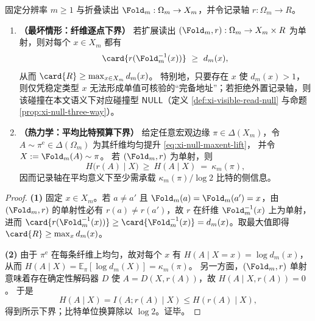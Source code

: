 \begin{theorem}\label{thm:address-defect-law}
固定分辨率 \(m\ge 1\) 与折叠读出 \(\Fold_m:\Omega_m\to X_m\)，并令记录轴 \(r:\Omega_m\to R\)。
\begin{enumerate}
  \item \textbf{（最坏情形：纤维逐点下界）}
  若扩展读出 \((\Fold_m,r):\Omega_m\to X_m\times R\) 为单射，则对每个 \(x\in X_m\) 都有
  \[
  \card{r(\Fold_m^{-1}(x))}\ \ge\ d_m(x),
  \]
  从而 \(\card{R}\ge \max_{x\in X_m} d_m(x)\)。
  特别地，只要存在 \(x\) 使 \(d_m(x)>1\)，则仅凭稳定类型 \(x\) 无法形成单值可核验的“完备地址”；若拒绝外置记录轴，则该碰撞在本文语义下对应碰撞型 \(\mathsf{NULL}\)（定义 \ref{def:xi-visible-read-null} 与命题 \ref{prop:xi-null-three-way}）。

  \item \textbf{（热力学：平均比特预算下界）}
  给定任意宏观边缘 \(\pi\in\Delta(X_m)\)，令 \(A\sim\pi^{\mathrm{e}}\in\Delta(\Omega_m)\) 为其纤维均匀提升 \eqref{eq:xi-null-maxent-lift}，
  并令 \(X:=\Fold_m(A)\sim\pi\)。
  若 \((\Fold_m,r)\) 为单射，则
  \[
  H\bigl(r(A)\mid X\bigr)\ \ge\ H(A\mid X)\ =\ \kappa_m(\pi),
  \]
  因而记录轴在平均意义下至少需承载 \(\kappa_m(\pi)/\log 2\) 比特的侧信息。
\end{enumerate}
\end{theorem}

\begin{proof}
\textbf{(1)} 固定 \(x\in X_m\)。若 \(a\neq a'\) 且 \(\Fold_m(a)=\Fold_m(a')=x\)，由 \((\Fold_m,r)\) 的单射性必有 \(r(a)\neq r(a')\)，故 \(r\) 在纤维 \(\Fold_m^{-1}(x)\) 上为单射，进而 \(\card{r(\Fold_m^{-1}(x))}\ge \card{\Fold_m^{-1}(x)}=d_m(x)\)。取最大值即得 \(\card{R}\ge \max_x d_m(x)\)。
\par
\textbf{(2)} 由于 \(\pi^{\mathrm{e}}\) 在每条纤维上均匀，故对每个 \(x\) 有
\(
H(A\mid X=x)=\log d_m(x)
\)，从而
\(
H(A\mid X)=\mathbb{E}_\pi[\log d_m(X)]=\kappa_m(\pi)
\)。
另一方面，\((\Fold_m,r)\) 单射意味着存在确定性解码器 \(D\) 使 \(A=D(X,r(A))\)，故 \(H(A\mid X,r(A))=0\)。
于是
\[
H(A\mid X)=I(A;r(A)\mid X)\le H(r(A)\mid X),
\]
得到所示下界；比特单位换算除以 \(\log 2\)。证毕。
\end{proof}

